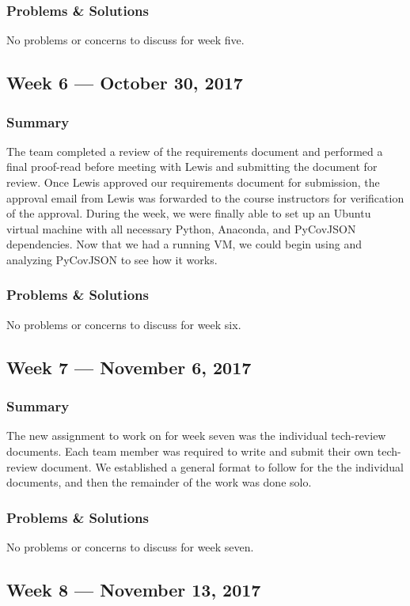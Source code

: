 \documentclass[onecolumn, draftclsnofoot,10pt, compsoc]{IEEEtran}
\begin{document}
\subsubsection{Problems \& Solutions}
No problems or concerns to discuss for week five.

\subsection{Week 6 --- October 30, 2017}
\subsubsection{Summary}
The team completed a review of the requirements document and performed a final proof-read before meeting with Lewis and submitting the document for review. Once Lewis approved our requirements document for submission, the approval email from Lewis was forwarded to the course instructors for verification of the approval. During the week, we were finally able to set up an Ubuntu virtual machine with all necessary Python, Anaconda, and PyCovJSON dependencies. Now that we had a running VM, we could begin using and analyzing PyCovJSON to see how it works.
\subsubsection{Problems \& Solutions}
No problems or concerns to discuss for week six.

\subsection{Week 7 --- November 6, 2017}
\subsubsection{Summary}
The new assignment to work on for week seven was the individual tech-review documents. Each team member was required to write and submit their own tech-review document. We established a general format to follow for the the individual documents, and then the remainder of the work was done solo.

\subsubsection{Problems \& Solutions}
No problems or concerns to discuss for week seven.

\subsection{Week 8 --- November 13, 2017}
\end{document}
